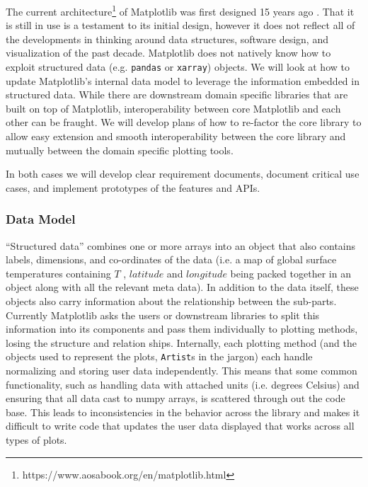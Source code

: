 \documentclass[11pt]{article}  %
\begin{document}
The current
architecture\footnote{https://www.aosabook.org/en/matplotlib.html} of
Matplotlib was first designed 15 years ago \cite{Hunter:2007}.  That
it is still in use is a testament to its initial design, however it
does not reflect all of the developments in thinking around data
structures, software design, and visualization of the past decade.
Matplotlib does not natively know how to exploit structured data
(e.g. \texttt{pandas} or \texttt{xarray}) objects.  We will look at
how to update Matplotlib's internal data model to leverage the
information embedded in structured data.  While there are downstream
domain specific libraries that are built on top of Matplotlib,
interoperability between core Matplotlib and each other can be
fraught.  We will develop plans of how to re-factor the core library
to allow easy extension and smooth interoperability between the core
library and mutually between the domain specific plotting tools.

In both cases we will develop clear requirement documents, document
critical use cases, and implement prototypes of the features and APIs.


\subsubsection{Data Model}

``Structured data'' combines one or more arrays into an object that
also contains labels, dimensions, and co-ordinates of the data (i.e. a
map of global surface temperatures containing $T$ , $latitude$ and
$longitude$ being packed together in an object along with all the
relevant meta data).  In addition to the data itself, these objects
also carry information about the relationship between the sub-parts.
Currently Matplotlib asks the users or downstream libraries to split
this information into its components and pass them individually to
plotting methods, losing the structure and relation ships.
Internally, each plotting method (and the objects used to represent
the plots, \texttt{Artist}s in the jargon) each handle normalizing and
storing user data independently.  This means that some common
functionality, such as handling data with attached units (i.e. degrees
Celsius) and ensuring that all data cast to numpy arrays, is scattered
through out the code base.  This leads to inconsistencies in the
behavior across the library and makes it difficult to write code that
updates the user data displayed that works across all types of plots.
\end{document}
